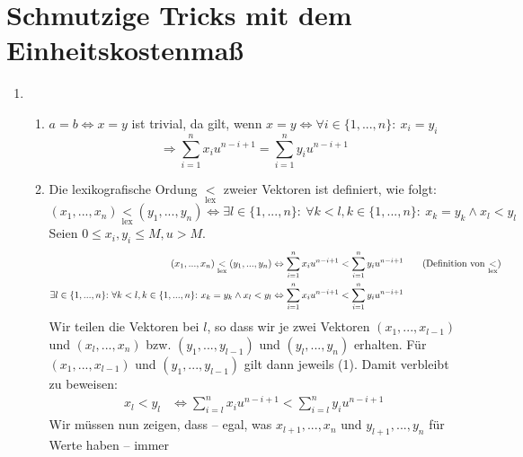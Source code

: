 \documentclass[a4paper,10pt]{scrartcl}
\renewcommand{\labelenumii}{(\theenumii)}
\renewcommand{\theenumii}{\roman{enumii}}
\begin{document}
\section{Schmutzige Tricks mit dem Einheitskostenmaß}
\begin{enumerate}
\item   \renewcommand{\labelenumii}{(\theenumii)}
        \renewcommand{\theenumii}{\arabic{enumii}}
        \begin{enumerate} \newcommand{\lex}[1]{\ensuremath{\underset{\text{lex}}{#1}}}
        \item   $a = b \Leftrightarrow x = y$ ist trivial, da gilt, wenn 
                $x = y \Leftrightarrow \forall i \in \{1, ..., n\}{:}\ x_i = y_i$\\
                \[\Rightarrow \sum\limits_{i=1}^{n} x_{i}u^{n-i+1} = \sum\limits_{i=1}^{n} y_{i}u^{n-i+1}\]
        \item   Die lexikografische Ordung $\lex{<}$ zweier Vektoren ist definiert, wie folgt:
                \[ (x_1,...,x_n) \lex{<} (y_1,...,y_n) \Leftrightarrow
                    \exists l \in \{1, ..., n\}{:}\ \forall k < l, k \in \{1, ..., n\}{:}\ x_k = y_k \land x_l < y_l
                \]
                Seien $0 \leq x_i, y_i \leq M, u > M$.
                \begin{align*}
                    (x_1, ..., x_n) \lex{<} (y_1, ..., y_n) 
                        &\Leftrightarrow \sum\limits_{i=1}^{n} x_{i}u^{n-i+1} < \sum\limits_{i=1}^{n} y_{i}u^{n-i+1}  
                    \tag{Definition von $\lex{<}$}\\
                    \exists l \in \{1, ..., n\}{:}\ \forall k < l, k \in \{1, ..., n\}{:}\ x_k = y_k \land x_l < y_l 
                        &\Leftrightarrow \sum\limits_{i=1}^{n} x_{i}u^{n-i+1} < \sum\limits_{i=1}^{n} y_{i}u^{n-i+1}
                \end{align*}
                Wir teilen die Vektoren bei $l$, so dass wir je zwei Vektoren $(x_1,...,x_{l-1})$ und $(x_l,...,x_n)$ bzw.
                $(y_1,...,y_{l-1})$ und $(y_l,...,y_n)$ erhalten. Für $(x_1, ..., x_{l-1})$ und $(y_1, ..., y_{l-1})$ gilt 
                dann jeweils (1). Damit verbleibt zu beweisen:
                \begin{align*}
                    x_l < y_l 
                        &\Leftrightarrow \sum\limits_{i=l}^{n} x_{i}u^{n-i+1} < \sum\limits_{i=l}^{n} y_{i}u^{n-i+1}
                \end{align*}
                Wir müssen nun zeigen, dass -- egal, was $x_{l+1},...,x_n$ und $y_{l+1},...,y_n$ für Werte haben -- immer

\end{enumerate}
\end{enumerate}
\end{document}
